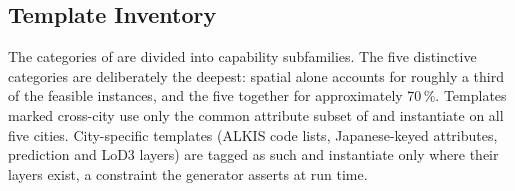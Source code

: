 \documentclass[sigconf,authordraft]{acmart}
\begin{document}
\subsection{Template Inventory}\label{app:questions_inventory}

The categories of  are divided into capability subfamilies. The five distinctive categories are deliberately the deepest: spatial alone accounts for roughly a third of the feasible instances, and the five together for approximately 70\,\%. Templates marked cross-city use only the common attribute subset of  and instantiate on all five cities. City-specific templates (ALKIS code lists, Japanese-keyed attributes, prediction and LoD3 layers) are tagged as such and instantiate only where their layers exist, a constraint the generator asserts at run time.
\end{document}
